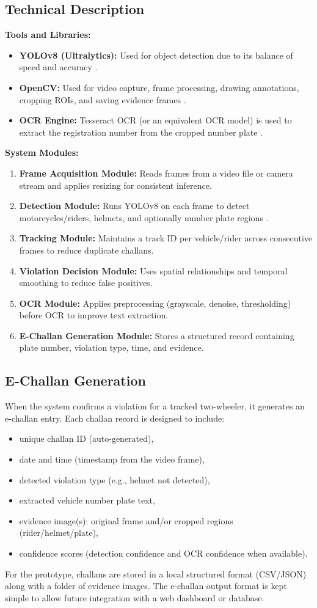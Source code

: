 \subsection{Technical Description}
\textbf{Tools and Libraries:}
\begin{itemize}[leftmargin=*]
  \item \textbf{YOLOv8 (Ultralytics):} Used for object detection due to its balance of speed and accuracy \cite{ultralyticsyolov8}.
  \item \textbf{OpenCV:} Used for video capture, frame processing, drawing annotations, cropping ROIs, and saving evidence frames \cite{opencv_library}.
  \item \textbf{OCR Engine:} Tesseract OCR (or an equivalent OCR model) is used to extract the registration number from the cropped number plate \cite{tesseract}.
\end{itemize}

\textbf{System Modules:}
\begin{enumerate}[leftmargin=*]
  \item \textbf{Frame Acquisition Module:} Reads frames from a video file or camera stream and applies resizing for consistent inference.
  \item \textbf{Detection Module:} Runs YOLOv8 on each frame to detect motorcycles/riders, helmets, and optionally number plate regions \cite{redmon2016yolo,ultralyticsyolov8}.
  \item \textbf{Tracking Module:} Maintains a track ID per vehicle/rider across consecutive frames to reduce duplicate challans.
  \item \textbf{Violation Decision Module:} Uses spatial relationships and temporal smoothing to reduce false positives.
  \item \textbf{OCR Module:} Applies preprocessing (grayscale, denoise, thresholding) before OCR to improve text extraction.
  \item \textbf{E-Challan Generation Module:} Stores a structured record containing plate number, violation type, time, and evidence.
\end{enumerate}

\subsection{E-Challan Generation}
When the system confirms a violation for a tracked two-wheeler, it generates an e-challan entry. Each challan record is designed to include:
\begin{itemize}[leftmargin=*]
  \item unique challan ID (auto-generated),
  \item date and time (timestamp from the video frame),
  \item detected violation type (e.g., helmet not detected),
  \item extracted vehicle number plate text,
  \item evidence image(s): original frame and/or cropped regions (rider/helmet/plate),
  \item confidence scores (detection confidence and OCR confidence when available).
\end{itemize}

For the prototype, challans are stored in a local structured format (CSV/JSON) along with a folder of evidence images. The e-challan output format is kept simple to allow future integration with a web dashboard or database.
